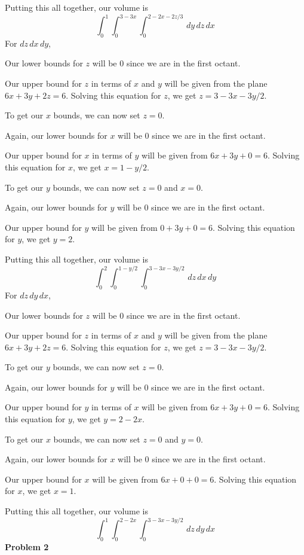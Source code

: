 \documentclass{article}
\begin{document}
Putting this all together, our volume is
\begin{equation*}
    \int_0^1\int_0^{3-3x}\int_0^{2-2x-2z/3}\,dy\,dz\,dx
\end{equation*}
For $dz\,dx\,dy$,

Our lower bounds for $z$ will be $0$ since we are in the first octant.

Our upper bound for $z$ in terms of $x$ and $y$ will be given from the plane $6x+3y+2z=6$. Solving this equation for $z$, we get $z=3-3x-3y/2$.

To get our $x$ bounds, we can now set $z=0$.

Again, our lower bounds for $x$ will be $0$ since we are in the first octant.

Our upper bound for $x$ in terms of $y$ will be given from $6x+3y+0=6$. Solving this equation for $x$, we get $x=1-y/2$.

To get our $y$ bounds, we can now set $z=0$ and $x=0$.

Again, our lower bounds for $y$ will be $0$ since we are in the first octant.

Our upper bound for $y$ will be given from $0+3y+0=6$. Solving this equation for $y$, we get $y=2$.

Putting this all together, our volume is
\begin{equation*}
   \int_0^2\int_0^{1-y/2}\int_0^{3-3x-3y/2}\,dz\,dx\,dy
\end{equation*}
For $dz\,dy\,dx$,

Our lower bounds for $z$ will be $0$ since we are in the first octant.

Our upper bound for $z$ in terms of $x$ and $y$ will be given from the plane $6x+3y+2z=6$. Solving this equation for $z$, we get $z=3-3x-3y/2$.

To get our $y$ bounds, we can now set $z=0$.

Again, our lower bounds for $y$ will be $0$ since we are in the first octant.

Our upper bound for $y$ in terms of $x$ will be given from $6x+3y+0=6$. Solving this equation for $y$, we get $y=2-2x$.

To get our $x$ bounds, we can now set $z=0$ and $y=0$.

Again, our lower bounds for $x$ will be $0$ since we are in the first octant.

Our upper bound for $x$ will be given from $6x+0+0=6$. Solving this equation for $x$, we get $x=1$.

Putting this all together, our volume is
\begin{equation*}
    \int_0^1\int_0^{2-2x}\int_0^{3-3x-3y/2}\,dz\,dy\,dx
\end{equation*}
\textbf{Problem 2}
\end{document}
